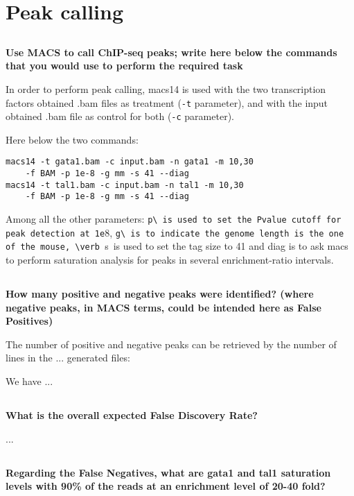 \documentclass[12pt, a4paper]{article}
\begin{document}
\section{Peak calling}

\subsection{}
\textbf{Use MACS to call ChIP-seq peaks; write here below the commands that you would use to perform the required task}

In order to perform peak calling, macs14 is used with the two transcription factors obtained .bam files as treatment (\verb|-t| parameter), and with the input obtained .bam file as control for both (\verb|-c| parameter).

Here below the two commands:

\begin{verbatim}
macs14 -t gata1.bam -c input.bam -n gata1 -m 10,30
    -f BAM -p 1e-8 -g mm -s 41 --diag
macs14 -t tal1.bam -c input.bam -n tal1 -m 10,30
    -f BAM -p 1e-8 -g mm -s 41 --diag
\end{verbatim}

Among all the other parameters: \verb -p\ is used to set the Pvalue cutoff for peak detection at 1e-8, \verb -g\ is to indicate the genome length is the one of the mouse, \verb -s\ is used to set the tag size to 41 and \verb --diag is to ask macs to perform saturation analysis for peaks in several enrichment-ratio intervals.

\subsection{}
\textbf{How many positive and negative peaks were identified? (where negative peaks, in MACS terms, could be intended here as False Positives)}

The number of positive and negative peaks can be retrieved by the number of lines in the ... generated files:

We have ...

\subsection{}
\textbf{What is the overall expected False Discovery Rate?}

...

\subsection{}
\textbf{Regarding the False Negatives, what are gata1 and tal1 saturation levels with 90\% of the reads at an enrichment level of 20-40 fold?}
\end{document}

